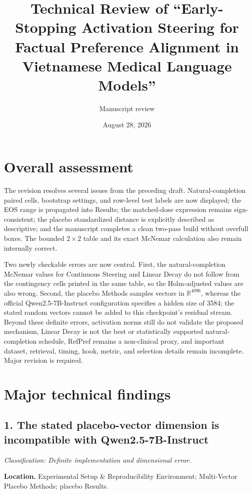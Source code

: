 \documentclass[11pt]{article}
\title{Technical Review of ``Early-Stopping Activation Steering for Factual Preference Alignment in Vietnamese Medical Language Models''}
\author{Manuscript review}
\date{August 28, 2026}
\newcommand{\findinglabel}[1]{\textbf{#1}}
\newcommand{\classification}[1]{\textit{Classification: #1.}}
\begin{document}
\maketitle

\section*{Overall assessment}

The revision resolves several issues from the preceding draft.  Natural-completion paired cells, bootstrap settings, and row-level test labels are now displayed; the EOS range is propagated into Results; the matched-dose expression remains sign-consistent; the placebo standardized distance is explicitly described as descriptive; and the manuscript completes a clean two-pass build without overfull boxes.  The bounded $2\times2$ table and its exact McNemar calculation also remain internally correct.

Two newly checkable errors are now central.  First, the natural-completion McNemar values for Continuous Steering and Linear Decay do not follow from the contingency cells printed in the same table, so the Holm-adjusted values are also wrong.  Second, the placebo Methods samples vectors in $\mathbb{R}^{4096}$, whereas the official Qwen2.5-7B-Instruct configuration specifies a hidden size of 3584; the stated random vectors cannot be added to this checkpoint's residual stream.  Beyond these definite errors, activation norms still do not validate the proposed mechanism, Linear Decay is not the best or statistically supported natural-completion schedule, RefPref remains a non-clinical proxy, and important dataset, retrieval, timing, hook, metric, and selection details remain incomplete.  Major revision is required.

\section*{Major technical findings}

\subsection*{1. The stated placebo-vector dimension is incompatible with Qwen2.5-7B-Instruct}

\classification{Definite implementation and dimensional error}

\findinglabel{Location.} Experimental Setup \& Reproducibility Environment; Multi-Vector Placebo Methods; placebo Results.
\end{document}
